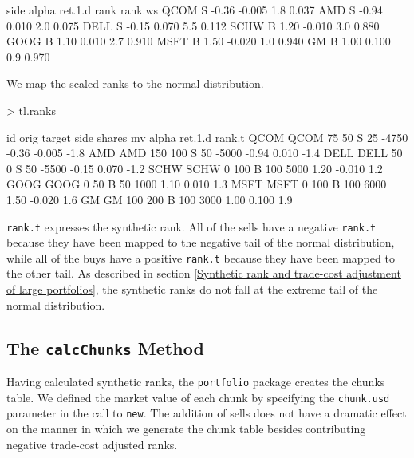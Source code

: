 \documentclass{article}
\begin{document}
\begin{Schunk}
\begin{Soutput}
     side alpha ret.1.d rank rank.ws
QCOM    S -0.36  -0.005  1.8   0.037
AMD     S -0.94   0.010  2.0   0.075
DELL    S -0.15   0.070  5.5   0.112
SCHW    B  1.20  -0.010  3.0   0.880
GOOG    B  1.10   0.010  2.7   0.910
MSFT    B  1.50  -0.020  1.0   0.940
GM      B  1.00   0.100  0.9   0.970
\end{Soutput}
\end{Schunk}

We map the scaled ranks to the normal distribution.


\begin{Schunk}
\begin{Sinput}
> tl.ranks
\end{Sinput}
\begin{Soutput}
       id orig target side shares    mv alpha ret.1.d rank.t
QCOM QCOM   75     50    S     25 -4750 -0.36  -0.005   -1.8
AMD   AMD  150    100    S     50 -5000 -0.94   0.010   -1.4
DELL DELL   50      0    S     50 -5500 -0.15   0.070   -1.2
SCHW SCHW    0    100    B    100  5000  1.20  -0.010    1.2
GOOG GOOG    0     50    B     50  1000  1.10   0.010    1.3
MSFT MSFT    0    100    B    100  6000  1.50  -0.020    1.6
GM     GM  100    200    B    100  3000  1.00   0.100    1.9
\end{Soutput}
\end{Schunk}

\texttt{rank.t} expresses the synthetic rank.  All of the
sells have a negative \texttt{rank.t} because they have been mapped to
the negative tail of the normal distribution, while all of the buys
have a positive \texttt{rank.t} because they have been mapped to the
other tail.  As described in section \ref{Synthetic rank and
trade-cost adjustment of large portfolios}, the synthetic ranks do not
fall at the extreme tail of the normal distribution.  

\subsection{The \texttt{calcChunks} Method}
\label{calcChunks lo}

Having calculated synthetic ranks, the \texttt{portfolio} package
creates the chunks table.  We defined the market value of each chunk
by specifying the \texttt{chunk.usd} parameter in the call to
\texttt{new}.  The addition of sells does not have a dramatic effect
on the manner in which we generate the chunk table besides
contributing negative trade-cost adjusted ranks.
\end{document}
